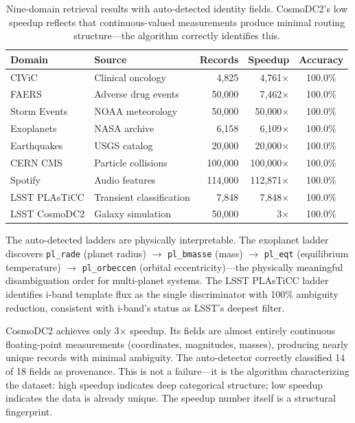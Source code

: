 \documentclass[11pt]{article}
\begin{document}
\begin{table}[h]
\centering
\small
\begin{tabular}{llrrc}
\toprule
Domain & Source & Records & Speedup & Accuracy \\
\midrule
CIViC & Clinical oncology & 4{,}825 & 4{,}761$\times$ & 100.0\% \\
FAERS & Adverse drug events & 50{,}000 & 7{,}462$\times$ & 100.0\% \\
Storm Events & NOAA meteorology & 50{,}000 & 50{,}000$\times$ & 100.0\% \\
Exoplanets & NASA archive & 6{,}158 & 6{,}109$\times$ & 100.0\% \\
Earthquakes & USGS catalog & 20{,}000 & 20{,}000$\times$ & 100.0\% \\
CERN CMS & Particle collisions & 100{,}000 & 100{,}000$\times$ & 100.0\% \\
Spotify & Audio features & 114{,}000 & 112{,}871$\times$ & 100.0\% \\
LSST PLAsTiCC & Transient classification & 7{,}848 & 7{,}848$\times$ & 100.0\% \\
LSST CosmoDC2 & Galaxy simulation & 50{,}000 & 3$\times$ & 100.0\% \\
\bottomrule
\end{tabular}
\caption{Nine-domain retrieval results with auto-detected identity fields. CosmoDC2's low speedup reflects that continuous-valued measurements produce minimal routing structure---the algorithm correctly identifies this.}
\label{tab:nine}
\end{table}

The auto-detected ladders are physically interpretable. The exoplanet ladder discovers \texttt{pl\_rade} (planet radius) $\to$ \texttt{pl\_bmasse} (mass) $\to$ \texttt{pl\_eqt} (equilibrium temperature) $\to$ \texttt{pl\_orbeccen} (orbital eccentricity)---the physically meaningful disambiguation order for multi-planet systems. The LSST PLAsTiCC ladder identifies i-band template flux as the single discriminator with 100\% ambiguity reduction, consistent with i-band's status as LSST's deepest filter.

CosmoDC2 achieves only 3$\times$ speedup. Its fields are almost entirely continuous floating-point measurements (coordinates, magnitudes, masses), producing nearly unique records with minimal ambiguity. The auto-detector correctly classified 14 of 18 fields as provenance. This is not a failure---it is the algorithm characterizing the dataset: high speedup indicates deep categorical structure; low speedup indicates the data is already unique. The speedup number itself is a structural fingerprint.
\end{document}
